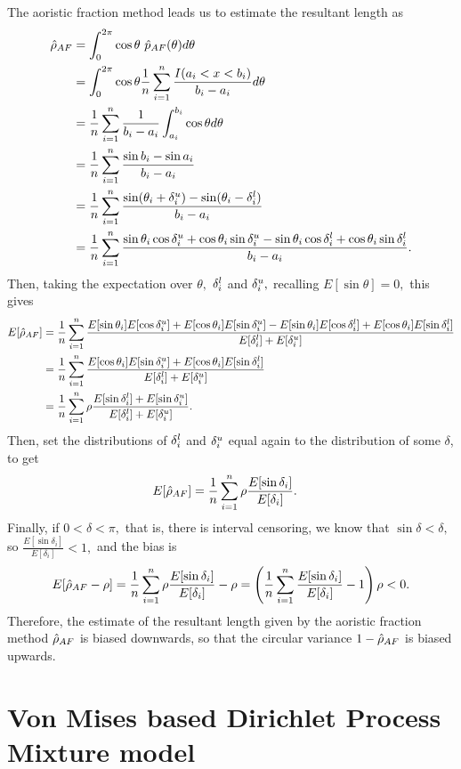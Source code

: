 The aoristic fraction method leads us to estimate the resultant length as
\begin{align}
\hat\rho_{AF} &= \int_0^{2\pi} \cos\theta  ~ \hat{p}_{AF}(\theta) d\theta \\
&= \int_0^{2\pi} \cos\theta \frac{1}{n}\sum_{i=1}^n \frac{I(a_i < x < b_i)}{b_i - a_i} d\theta \\
&= \frac{1}{n}\sum_{i=1}^n  \frac{1}{b_i - a_i}  \int_{a_i}^{b_i} \cos\theta d\theta \\
&= \frac{1}{n}\sum_{i=1}^n  \frac{\sin b_i - \sin a_i}{b_i - a_i} \\
&= \frac{1}{n}\sum_{i=1}^n  \frac{\sin(\theta_i + {\delta^u_i}) - \sin(\theta_i - {\delta^l_i})}{b_i - a_i} \\
&= \frac{1}{n}\sum_{i=1}^n  \frac{\sin \theta_i \cos{\delta^u_i} + \cos \theta_i \sin{\delta^u_i} - \sin \theta_i \cos{\delta^l_i} + \cos \theta_i \sin{\delta^l_i}}{b_i - a_i}.
\end{align}
Then, taking the expectation over $\theta,$ ${\delta^l_i}$ and ${\delta^u_i},$ recalling $E[\sin\theta] = 0,$ this gives
\begin{align}
E[\hat\rho_{AF}] &= \frac{1}{n}\sum_{i=1}^n \frac{E[\sin \theta_i] E[\cos{\delta^u_i}] + E[\cos \theta_i] E[ \sin{\delta^u_i}] - E[\sin \theta_i] E[\cos{\delta^l_i}] + E[\cos \theta_i] E[\sin{\delta^l_i}]}{E[{\delta^l_i}] + E[{\delta^u_i}]} \\
&= \frac{1}{n}\sum_{i=1}^n \frac{E[\cos \theta_i] E[\sin{\delta^u_i}] + E[\cos \theta_i] E[\sin{\delta^l_i}]}{E[{\delta^l_i}] + E[{\delta^u_i}]}  \\
&= \frac{1}{n}\sum_{i=1}^n \rho  \frac{E[\sin{\delta^l_i}] + E[\sin{\delta^u_i}]}{E[{\delta^l_i}] + E[{\delta^u_i}]}.
\end{align}
Then, set the distributions of ${\delta^l_i}$ and ${\delta^u_i}$ equal again to the distribution of some $\delta$, to get
\begin{align}
E[\hat\rho_{AF}]&= \frac{1}{n}\sum_{i=1}^n \rho  \frac{E[\sin\delta_i]}{E[\delta_i]}.
\end{align}
Finally, if $0 < \delta < \pi,$ that is, there is interval censoring, we know that $\sin\delta < \delta,$ so $\frac{E[\sin\delta_i]}{E[\delta_i]} < 1,$ and the bias is
\begin{equation}
E[\hat\rho_{AF} - \rho] = \frac{1}{n}\sum_{i=1}^n \rho  \frac{E[\sin\delta_i]}{E[\delta_i]} - \rho  = \left(\frac{1}{n}\sum_{i=1}^n  \frac{E[\sin\delta_i]}{E[\delta_i]} - 1\right) \rho < 0.
\end{equation}
Therefore, the estimate of the resultant length given by the aoristic fraction method $\hat\rho_{AF}$ is biased downwards, so that the circular variance $1 - \hat\rho_{AF}$ is biased upwards.

\newpage

\section{Von Mises based Dirichlet Process Mixture model} \label{dpmdetails}

